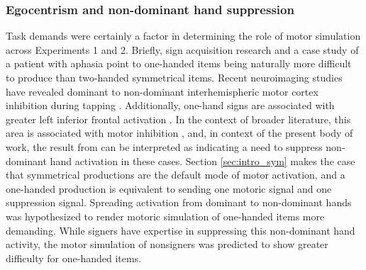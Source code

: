         \subsubsection{Egocentrism and non-dominant hand suppression}
            \label{sec:disc_sym}
            Task demands were certainly a factor in determining the role of motor simulation across Experiments 1 and 2. Briefly, sign acquisition research \cite{meier2006} and a case study of a patient with aphasia \cite{hickok1996} point to one-handed items being naturally more difficult to produce than two-handed symmetrical items. Recent neuroimaging studies have revealed dominant to non-dominant interhemispheric motor cortex inhibition during tapping \cite{aramaki2006,vine2008a}. Additionally, one-hand signs are associated with greater left inferior frontal activation \cite{emm2016}. In the context of broader literature, this area is associated with motor inhibition \cite{swick2008}, and, in context of the present body of work, the result from  can be interpreted as indicating a need to suppress non-dominant hand activation in these cases. Section \ref{sec:intro_sym} makes the case that symmetrical productions are the default mode of motor activation, and a one-handed production is equivalent to sending one motoric signal and one suppression signal. Spreading activation from dominant to non-dominant hands was hypothesized to render motoric simulation of one-handed items more demanding. While signers have expertise in suppressing this non-dominant hand activity, the motor simulation of nonsigners was predicted to show greater difficulty for one-handed items. \par
